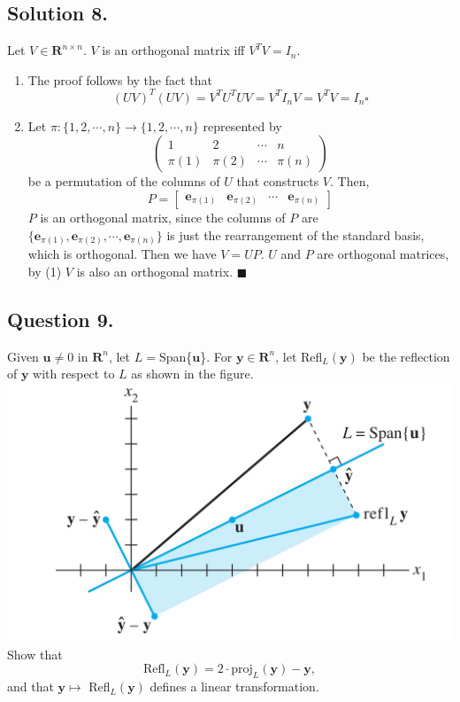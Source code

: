 \documentclass{article}
\begin{document}
\subsection*{Solution 8.}
Let $V\in\mathbf{R}^{n\times n}$. $V$ is an orthogonal matrix iff $V^TV=I_n$.
\begin{enumerate}[label=(\arabic*)]
    \item The proof follows by the fact that 
    \[(UV)^T(UV)=V^TU^T UV=V^T I_n V=V^TV=I_n\square\]
    \item Let $\pi:\{1,2,\cdots,n\}\to\{1,2,\cdots,n\}$
    represented by
    \[\left(\begin{array}{rrrr}
    1 & 2 & \cdots & n \\
    \pi(1) & \pi(2) & \cdots & \pi(n)
    \end{array}\right)\]
    be a permutation of the columns of $U$ that constructs $V$. Then,
    \[P=[\begin{array}{rrrr}\mathbf{e}_{\pi(1)}&\mathbf{e}_{\pi(2)}&\cdots&\mathbf{e}_{\pi(n)}\end{array}]\]
    $P$ is an orthogonal matrix, since the columns of $P$ are $\{\mathbf{e}_{\pi(1)},\mathbf{e}_{\pi(2)},\cdots,\mathbf{e}_{\pi(n)}\}$ is just the rearrangement of the standard basis, which is orthogonal.\newline
    Then we have $V=UP$. $U$ and $P$ are orthogonal matrices, by (1) $V$ is also an orthogonal matrix.  $\blacksquare$
\end{enumerate}
\subsection*{Question 9.}
Given $\mathbf{u}\neq 0$ in $\mathbf{R}^n$, let $L=$Span\{$\mathbf{u}$\}. For $\mathbf{y}\in\mathbf{R}^n$, let Refl$_L(\mathbf{y})$ be the reflection of $\mathbf{y}$ with respect to $L$ as shown in the figure.\newline
\includegraphics[scale=0.5]{img/20211206_linalg_HW9_Fig_1.PNG}\newline
Show that 
\[\text{Refl}_L(\mathbf{y})=2\cdot \text{proj}_L(\mathbf{y})-\mathbf{y},\]
and that $\mathbf{y}\mapsto$ Refl$_L(\mathbf{y})$ defines a linear transformation.
\end{document}
